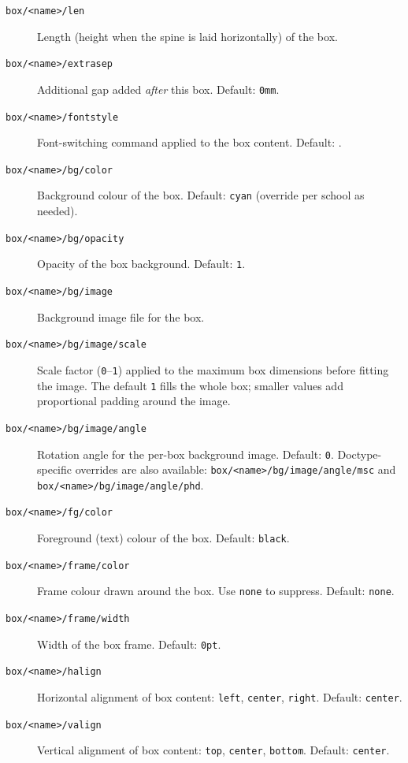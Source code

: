 \begin{description}
  \item[\texttt{box/<name>/len}] Length (height when the spine is laid
    horizontally) of the box.
\begin{latexcode}
\end{latexcode}

  \item[\texttt{box/<name>/extrasep}] Additional gap added \emph{after}
    this box.  Default: \texttt{0mm}.
  \item[\texttt{box/<name>/fontstyle}] Font-switching command applied to
    the box content.  Default: \latexinline{\sffamily}.
  \item[\texttt{box/<name>/bg/color}] Background colour of the box.
    Default: \texttt{cyan} (override per school as needed).
  \item[\texttt{box/<name>/bg/opacity}] Opacity of the box background.
    Default: \texttt{1}.
  \item[\texttt{box/<name>/bg/image}] Background image file for the box.
\begin{latexcode}
\end{latexcode}

  \item[\texttt{box/<name>/bg/image/scale}] Scale factor (\texttt{0}–\texttt{1})
    applied to the maximum box dimensions before fitting the image.
    The default \texttt{1} fills the whole box; smaller values add
    proportional padding around the image.
\begin{latexcode}
\end{latexcode}

  \item[\texttt{box/<name>/bg/image/angle}] Rotation angle for the
    per-box background image.  Default: \texttt{0}.
    Doctype-specific overrides are also available:
    \texttt{box/<name>/bg/image/angle/msc} and
    \texttt{box/<name>/bg/image/angle/phd}.
  \item[\texttt{box/<name>/fg/color}] Foreground (text) colour of the
    box.  Default: \texttt{black}.
\begin{latexcode}
\end{latexcode}

  \item[\texttt{box/<name>/frame/color}] Frame colour drawn around the
    box.  Use \texttt{none} to suppress.  Default: \texttt{none}.
  \item[\texttt{box/<name>/frame/width}] Width of the box frame.
    Default: \texttt{0pt}.
  \item[\texttt{box/<name>/halign}] Horizontal alignment of box content:
    \texttt{left}, \texttt{center}, \texttt{right}.
    Default: \texttt{center}.
  \item[\texttt{box/<name>/valign}] Vertical alignment of box content:
    \texttt{top}, \texttt{center}, \texttt{bottom}.
    Default: \texttt{center}.
\end{description}

